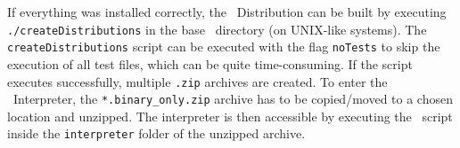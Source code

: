 If everything was installed correctly, the \setlx\ Distribution can be built by executing \lstinline{./createDistributions} in the base \setlx\ directory (on UNIX-like systems). The \lstinline{createDistributions} script can be executed with the flag \lstinline{noTests} to skip the execution of all test files, which can be quite time-consuming. If the script executes successfully, multiple \lstinline{.zip} archives are created. To enter the \setlx\ Interpreter, the \lstinline{*.binary_only.zip} archive has to be copied/moved to a chosen location and unzipped. The interpreter is then accessible by executing the \setlx\ script inside the \lstinline{interpreter} folder of the unzipped archive.